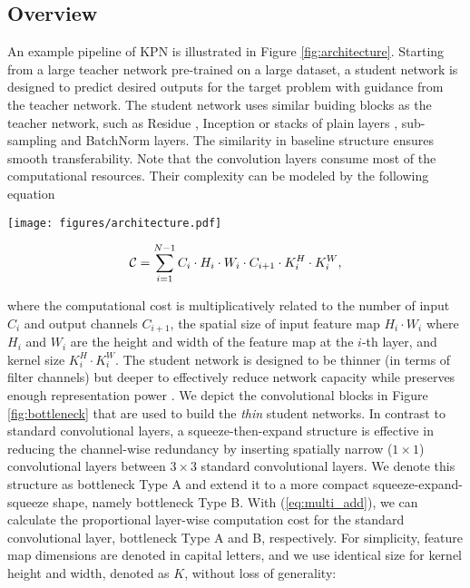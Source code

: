 \documentclass[journal]{IEEEtran}
\begin{document}
\subsection{Overview}

An example pipeline of KPN is illustrated in Figure \ref{fig:architecture}. Starting from a large teacher network pre-trained on a large dataset, a student network is designed to predict desired outputs for the  target problem with guidance from the teacher network. The student network uses similar buiding blocks as the teacher network, such as Residue \cite{he2016deep}, Inception \cite{szegedy2016rethinking} or stacks of plain layers \cite{simonyan2014very},  sub-sampling and BatchNorm \cite{ioffe2015batch} layers. The similarity in baseline structure ensures smooth transferability. Note that the convolution layers consume most of the computational resources.
Their complexity can be modeled by the following equation

\begin{figure*}[ht]
\begin{center}
   \texttt{[image: figures/architecture.pdf]}
\end{center}
   \caption{KPN architecture. Solid arrows showing the forward data-flow, dotted arrows showing the paths for gradients.}
\label{fig:architecture}
\end{figure*}

\begin{equation}
\label{eq:multi_add}
    {\cal C} = \sum_{i=1}^{N-1}{C_i \cdot H_i \cdot W_i \cdot C_{i+1} \cdot K^H_{i} \cdot K^W_{i}},
\end{equation}

where the computational cost is multiplicatively related to the number of input $C_i$ and output channels $C_{i+1}$, the spatial size of input feature map $H_i \cdot W_i$ where $H_i$ and $W_i$ are the height and width of the feature map at the $i$-th layer, and kernel size $K^H_{i} \cdot K^W_{i}$. 
The student network is designed to be thinner (in terms of filter channels) but deeper to effectively reduce network capacity while preserves enough representation power \cite{ba2014deep, romero2014fitnets}. We depict the convolutional blocks in Figure \ref{fig:bottleneck} that are used to build the \textit{thin} student networks. In contrast to standard convolutional layers, a squeeze-then-expand \cite{iandola2016squeezenet, redmon2016yolo9000} structure is effective in reducing the channel-wise redundancy by inserting spatially narrow ($1\times1$) convolutional layers between $3\times3$ standard convolutional layers. We denote this structure as bottleneck Type A and extend it to a more compact squeeze-expand-squeeze shape, namely bottleneck Type B. With (\ref{eq:multi_add}), we can calculate the proportional layer-wise computation cost for the standard convolutional layer, bottleneck Type A and B, respectively. For simplicity, feature map dimensions are denoted in capital letters, and we use identical size for kernel height and width, denoted as $K$, without loss of generality:
\end{document}
